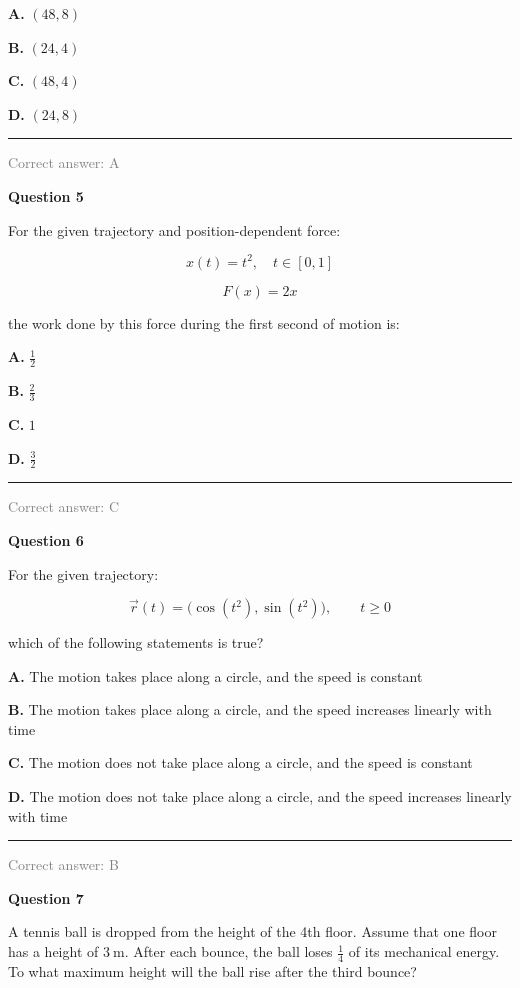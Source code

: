 \documentclass[11pt,a4paper]{article}
\newcommand{\answernote}[1]{%
\vfill
\noindent\textcolor{gray}{\rule{\linewidth}{0.4pt}}

{\small\textcolor{gray}{Correct answer: #1}}
}
\begin{document}
{\large
\textbf{A.} $(48, 8)$

\textbf{B.} $(24, 4)$

\textbf{C.} $(48, 4)$

\textbf{D.} $(24, 8)$
}

\answernote{A}
\newpage

{\LARGE\textbf{Question 5}}

For the given trajectory and position-dependent force:

\[
x(t) = t^2, \quad t \in [0,1]
\]

\[
F(x) = 2x
\]

the work done by this force during the first second of motion is:

\vspace{0.5em}

{\large
\textbf{A.} $\frac{1}{2}$

\textbf{B.} $\frac{2}{3}$

\textbf{C.} $1$

\textbf{D.} $\frac{3}{2}$
}

\answernote{C}
\newpage

{\LARGE\textbf{Question 6}}

For the given trajectory:

\[
\vec r(t) = \bigl(\cos(t^2), \sin(t^2)\bigr), \qquad t \ge 0
\]

which of the following statements is true?

\vspace{0.5em}

{\large
\textbf{A.} The motion takes place along a circle, and the speed is constant

\textbf{B.} The motion takes place along a circle, and the speed increases linearly with time

\textbf{C.} The motion does not take place along a circle, and the speed is constant

\textbf{D.} The motion does not take place along a circle, and the speed increases linearly with time
}

\answernote{B}
\newpage

{\LARGE\textbf{Question 7}}

A tennis ball is dropped from the height of the 4th floor. Assume that one floor has a height of $3\ \text{m}$. After each bounce, the ball loses $\frac{1}{4}$ of its mechanical energy. To what maximum height will the ball rise after the third bounce?

\vspace{0.5em}
\end{document}
